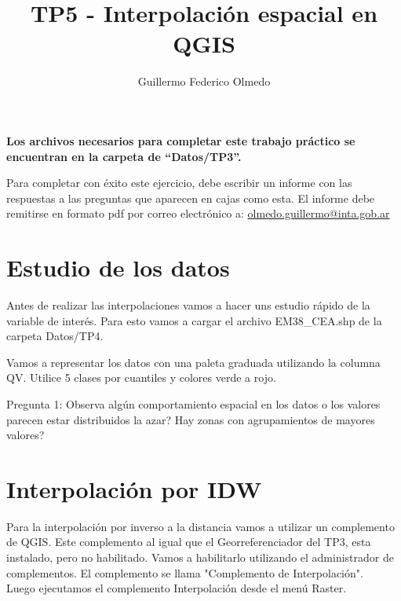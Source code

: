 \documentclass[onecolumn]{article}
\title{TP5 - Interpolación espacial en QGIS}
\author{Guillermo Federico Olmedo}
\begin{document}

\maketitle

\tableofcontents
\bigskip

\textbf{Los archivos necesarios para completar este trabajo práctico se encuentran en la carpeta de “Datos/TP3”. }\\

\begin{mdframed}
	Para completar con éxito este ejercicio, debe escribir un informe con las respuestas a las preguntas que aparecen en cajas como esta. El informe debe remitirse en formato pdf por correo electrónico a: \url{olmedo.guillermo@inta.gob.ar}
\end{mdframed}

\section{Estudio de los datos}

Antes de realizar las interpolaciones vamos a hacer uns estudio rápido de la variable de interés. Para esto vamos a cargar el archivo EM38\_CEA.shp de la carpeta Datos/TP4. 

Vamos a representar los datos con una paleta graduada utilizando la columna QV. Utilice 5 clases por cuantiles y colores verde a rojo.

\begin{mdframed}[]
	Pregunta 1: Observa algún comportamiento espacial en los datos o los valores parecen estar distribuidos la azar? Hay zonas con agrupamientos de mayores valores?
\end{mdframed}

\section{Interpolación por IDW}

Para la interpolación por inverso a la distancia vamos a utilizar un complemento de QGIS. Este complemento al igual que el Georreferenciador del TP3, esta instalado, pero no habilitado. Vamos a habilitarlo utilizando el administrador de complementos. El complemento se llama "Complemento de Interpolación". \\

Luego ejecutamos el complemento Interpolación desde el menú Raster. 
\end{document}
